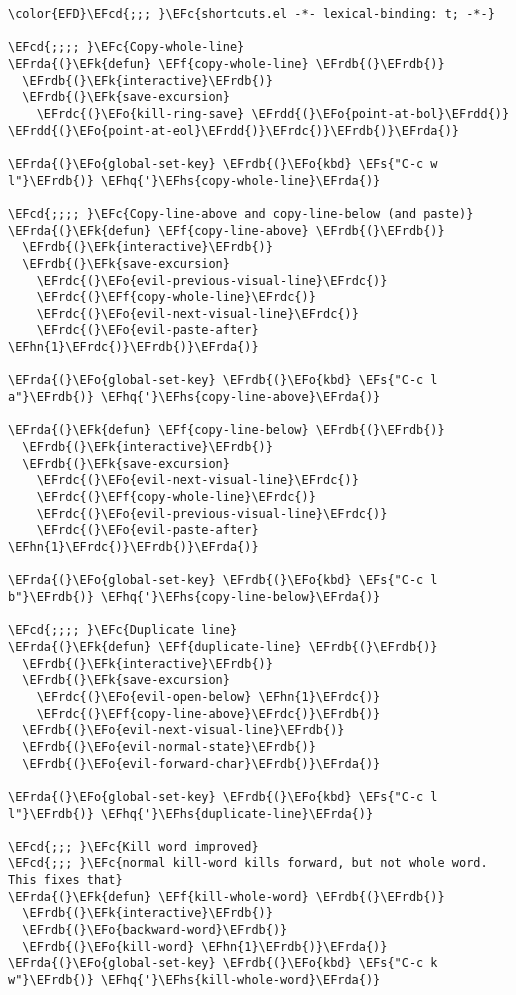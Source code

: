 \documentclass[a4wide,10pt]{article}
\newcommand{\EFc}[1]{\textcolor{EFc}{#1}} %
\newcommand{\EFcd}[1]{\textcolor{EFcd}{#1}} %
\newcommand{\EFs}[1]{\textcolor{EFs}{#1}} %
\newcommand{\EFk}[1]{\textcolor{EFk}{#1}} %
\newcommand{\EFf}[1]{\textcolor{EFf}{#1}} %
\newcommand{\EFo}[1]{\textcolor{EFo}{#1}} %
\newcommand{\EFhn}[1]{\textcolor{EFhn}{\textbf{#1}}} %
\newcommand{\EFhq}[1]{\textcolor{EFhq}{#1}} %
\newcommand{\EFhs}[1]{\textcolor{EFhs}{#1}} %
\newcommand{\EFrda}[1]{\textcolor{EFrda}{#1}} %
\newcommand{\EFrdb}[1]{\textcolor{EFrdb}{#1}} %
\newcommand{\EFrdc}[1]{\textcolor{EFrdc}{#1}} %
\newcommand{\EFrdd}[1]{\textcolor{EFrdd}{#1}} %
\begin{document}
\begin{Code}
\begin{Verbatim}
\color{EFD}\EFcd{;;; }\EFc{shortcuts.el -*- lexical-binding: t; -*-}

\EFcd{;;;; }\EFc{Copy-whole-line}
\EFrda{(}\EFk{defun} \EFf{copy-whole-line} \EFrdb{(}\EFrdb{)}
  \EFrdb{(}\EFk{interactive}\EFrdb{)}
  \EFrdb{(}\EFk{save-excursion}
    \EFrdc{(}\EFo{kill-ring-save} \EFrdd{(}\EFo{point-at-bol}\EFrdd{)} \EFrdd{(}\EFo{point-at-eol}\EFrdd{)}\EFrdc{)}\EFrdb{)}\EFrda{)}

\EFrda{(}\EFo{global-set-key} \EFrdb{(}\EFo{kbd} \EFs{"C-c w l"}\EFrdb{)} \EFhq{'}\EFhs{copy-whole-line}\EFrda{)}

\EFcd{;;;; }\EFc{Copy-line-above and copy-line-below (and paste)}
\EFrda{(}\EFk{defun} \EFf{copy-line-above} \EFrdb{(}\EFrdb{)}
  \EFrdb{(}\EFk{interactive}\EFrdb{)}
  \EFrdb{(}\EFk{save-excursion}
    \EFrdc{(}\EFo{evil-previous-visual-line}\EFrdc{)}
    \EFrdc{(}\EFf{copy-whole-line}\EFrdc{)}
    \EFrdc{(}\EFo{evil-next-visual-line}\EFrdc{)}
    \EFrdc{(}\EFo{evil-paste-after} \EFhn{1}\EFrdc{)}\EFrdb{)}\EFrda{)}

\EFrda{(}\EFo{global-set-key} \EFrdb{(}\EFo{kbd} \EFs{"C-c l a"}\EFrdb{)} \EFhq{'}\EFhs{copy-line-above}\EFrda{)}

\EFrda{(}\EFk{defun} \EFf{copy-line-below} \EFrdb{(}\EFrdb{)}
  \EFrdb{(}\EFk{interactive}\EFrdb{)}
  \EFrdb{(}\EFk{save-excursion}
    \EFrdc{(}\EFo{evil-next-visual-line}\EFrdc{)}
    \EFrdc{(}\EFf{copy-whole-line}\EFrdc{)}
    \EFrdc{(}\EFo{evil-previous-visual-line}\EFrdc{)}
    \EFrdc{(}\EFo{evil-paste-after} \EFhn{1}\EFrdc{)}\EFrdb{)}\EFrda{)}

\EFrda{(}\EFo{global-set-key} \EFrdb{(}\EFo{kbd} \EFs{"C-c l b"}\EFrdb{)} \EFhq{'}\EFhs{copy-line-below}\EFrda{)}

\EFcd{;;;; }\EFc{Duplicate line}
\EFrda{(}\EFk{defun} \EFf{duplicate-line} \EFrdb{(}\EFrdb{)}
  \EFrdb{(}\EFk{interactive}\EFrdb{)}
  \EFrdb{(}\EFk{save-excursion}
    \EFrdc{(}\EFo{evil-open-below} \EFhn{1}\EFrdc{)}
    \EFrdc{(}\EFf{copy-line-above}\EFrdc{)}\EFrdb{)}
  \EFrdb{(}\EFo{evil-next-visual-line}\EFrdb{)}
  \EFrdb{(}\EFo{evil-normal-state}\EFrdb{)}
  \EFrdb{(}\EFo{evil-forward-char}\EFrdb{)}\EFrda{)}

\EFrda{(}\EFo{global-set-key} \EFrdb{(}\EFo{kbd} \EFs{"C-c l l"}\EFrdb{)} \EFhq{'}\EFhs{duplicate-line}\EFrda{)}

\EFcd{;;; }\EFc{Kill word improved}
\EFcd{;;; }\EFc{normal kill-word kills forward, but not whole word. This fixes that}
\EFrda{(}\EFk{defun} \EFf{kill-whole-word} \EFrdb{(}\EFrdb{)}
  \EFrdb{(}\EFk{interactive}\EFrdb{)}
  \EFrdb{(}\EFo{backward-word}\EFrdb{)}
  \EFrdb{(}\EFo{kill-word} \EFhn{1}\EFrdb{)}\EFrda{)}
\EFrda{(}\EFo{global-set-key} \EFrdb{(}\EFo{kbd} \EFs{"C-c k w"}\EFrdb{)} \EFhq{'}\EFhs{kill-whole-word}\EFrda{)}


\end{Verbatim}
\end{Code}
\end{document}
